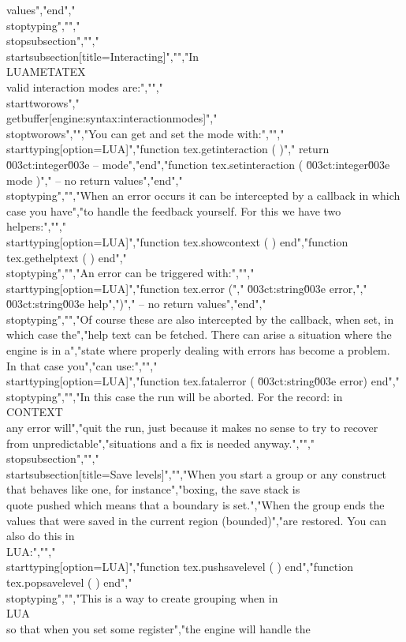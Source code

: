 values","end","\\stoptyping","","\\stopsubsection","","\\startsubsection[title=Interacting]","","In \\LUAMETATEX\\ valid interaction modes are:","","\\starttworows","\\getbuffer[engine:syntax:interactionmodes]","\\stoptworows","","You can get and set the mode with:","","\\starttyping[option=LUA]","function tex.getinteraction ( )","    return \u003ct:integer\u003e -- mode","end","function tex.setinteraction ( \u003ct:integer\u003e mode )","    -- no return values","end","\\stoptyping","","When an error occurs it can be intercepted by a callback in which case you have","to handle the feedback yourself. For this we have two helpers:","","\\starttyping[option=LUA]","function tex.showcontext ( ) end","function tex.gethelptext ( ) end","\\stoptyping","","An error can be triggered with:","","\\starttyping[option=LUA]","function tex.error (","    \u003ct:string\u003e error,","    \u003ct:string\u003e help",")","    -- no return values","end","\\stoptyping","","Of course these are also intercepted by the callback, when set, in which case the","help text can be fetched. There can arise a situation where the engine is in a","state where properly dealing with errors has become a problem. In that case you","can use:","","\\starttyping[option=LUA]","function tex.fatalerror ( \u003ct:string\u003e error) end","\\stoptyping","","In this case the run will be aborted. For the record: in \\CONTEXT\\ any error will","quit the run, just because it makes no sense to try to recover from unpredictable","situations and a fix is needed anyway.","","\\stopsubsection","","\\startsubsection[title=Save levels]","","When you start a group or any construct that behaves like one, for instance","boxing, the save stack is \\quote {pushed} which means that a boundary is set.","When the group ends the values that were saved in the current region (bounded)","are restored. You can also do this in \\LUA:","","\\starttyping[option=LUA]","function tex.pushsavelevel ( ) end","function tex.popsavelevel  ( ) end","\\stoptyping","","This is a way to create grouping when in \\LUA\\ so that when you set some register","the engine will handle the 